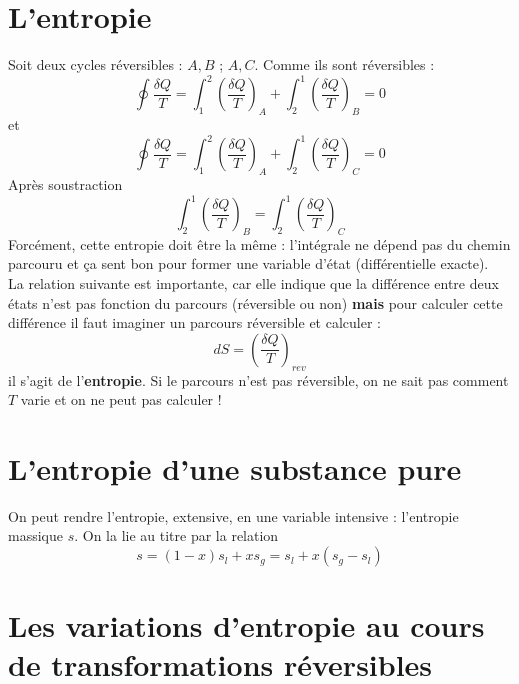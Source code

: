 	
	\section{L'entropie}
	Soit deux cycles réversibles : $A,B$ ; $A,C$. Comme ils sont réversibles  :
	\begin{equation}
	\oint \dfrac{\delta Q}{T} = \int_1^2 \left(\dfrac{\delta Q}{T}\right)_A + 
	\int_2^1 \left(\dfrac{\delta Q}{T}\right)_B = 0
	\end{equation}
	et
	\begin{equation}
		\oint \dfrac{\delta Q}{T} = \int_1^2 \left(\dfrac{\delta Q}{T}\right)_A + 
	\int_2^1 \left(\dfrac{\delta Q}{T}\right)_C = 0
	\end{equation}
	Après soustraction
	\begin{equation}
	\int_2^1 \left(\dfrac{\delta Q}{T}\right)_B = \int_2^1 \left(\dfrac{\delta 
	Q}{T}\right)_C
	\end{equation}
	Forcément, cette entropie doit être la même : l'intégrale ne dépend pas du 
	chemin parcouru et ça sent bon pour former une variable d'état (différentielle 
	exacte).\\
	La relation suivante est importante, car elle indique que la différence entre 
	deux états n'est pas fonction du parcours (réversible ou non) \textbf{mais} 
	pour calculer cette différence il faut imaginer un parcours réversible et 
	calculer :
	\begin{equation}
	dS = \left(\dfrac{\delta Q}{T}\right)_{rev}
	\end{equation}
	il s'agit de l'\textbf{entropie}. Si le parcours n'est pas réversible, on ne 
	sait pas comment $T$ varie et on ne peut pas calculer !
	
	\section{L’entropie d’une substance pure}
	On peut rendre l'entropie, extensive, en une variable intensive : l'entropie 
	massique $s$. On la lie au titre par la relation
	\begin{equation}
	s = (1-x)s_l + xs_g = s_l + x(s_g-s_l)
	\end{equation}
	
	
	\section{Les variations d’entropie au cours de transformations réversibles}
